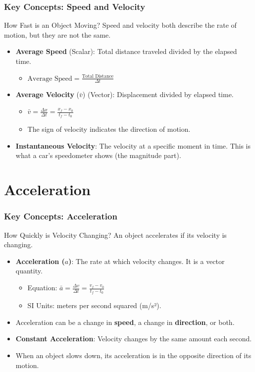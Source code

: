 \documentclass{beamer}
\begin{document}
\begin{frame}
\frametitle{Key Concepts: Speed and Velocity}
\begin{block}{How Fast is an Object Moving?}
Speed and velocity both describe the rate of motion, but they are not the same.
\end{block}
\begin{itemize}
    \item \textbf{Average Speed} (Scalar): Total distance traveled divided by the elapsed time.
    \begin{itemize}
        \item $\text{Average Speed} = \frac{\text{Total Distance}}{\Delta t}$
    \end{itemize}
    \item \textbf{Average Velocity} ($\bar{v}$) (Vector): Displacement divided by elapsed time.
    \begin{itemize}
        \item $\bar{v} = \frac{\Delta x}{\Delta t} = \frac{x_f - x_0}{t_f - t_0}$
        \item The sign of velocity indicates the direction of motion.
    \end{itemize}
    \item \textbf{Instantaneous Velocity}: The velocity at a specific moment in time. This is what a car's speedometer shows (the magnitude part).
\end{itemize}
\end{frame}

\section{Acceleration}

\begin{frame}
\frametitle{Key Concepts: Acceleration}
\begin{block}{How Quickly is Velocity Changing?}
An object accelerates if its velocity is changing.
\end{block}
\begin{itemize}
    \item \textbf{Acceleration ($a$)}: The rate at which velocity changes. It is a \alert{vector} quantity.
    \begin{itemize}
        \item Equation: $\bar{a} = \frac{\Delta v}{\Delta t} = \frac{v_f - v_0}{t_f - t_0}$
        \item SI Units: meters per second squared (m/s²).
    \end{itemize}
    \item Acceleration can be a change in \textbf{speed}, a change in \textbf{direction}, or both.
    \item \textbf{Constant Acceleration}: Velocity changes by the same amount each second.
    \item When an object slows down, its acceleration is in the \alert{opposite direction} of its motion.
\end{itemize}
\end{frame}
\end{document}
